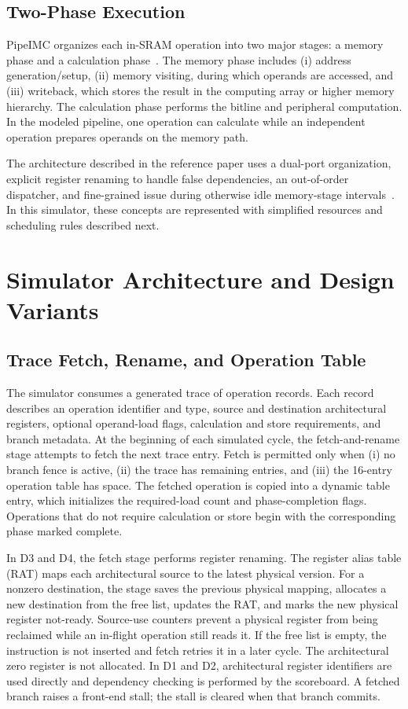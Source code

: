 \documentclass[conference]{IEEEtran}
\begin{document}
\subsection{Two-Phase Execution}
PipeIMC organizes each in-SRAM operation into two major stages: a memory phase and a calculation phase~\cite{pipeimc}. The memory phase includes (i) address generation/setup, (ii) memory visiting, during which operands are accessed, and (iii) writeback, which stores the result in the computing array or higher memory hierarchy. The calculation phase performs the bitline and peripheral computation. In the modeled pipeline, one operation can calculate while an independent operation prepares operands on the memory path.

The architecture described in the reference paper uses a dual-port organization, explicit register renaming to handle false dependencies, an out-of-order dispatcher, and fine-grained issue during otherwise idle memory-stage intervals~\cite{pipeimc}. In this simulator, these concepts are represented with simplified resources and scheduling rules described next.


\section{Simulator Architecture and Design Variants}
\subsection{Trace Fetch, Rename, and Operation Table}
The simulator consumes a generated trace of operation records. Each record describes an operation identifier and type, source and destination architectural registers, optional operand-load flags, calculation and store requirements, and branch metadata. At the beginning of each simulated cycle, the fetch-and-rename stage attempts to fetch the next trace entry. Fetch is permitted only when (i) no branch fence is active, (ii) the trace has remaining entries, and (iii) the 16-entry operation table has space. The fetched operation is copied into a dynamic table entry, which initializes the required-load count and phase-completion flags. Operations that do not require calculation or store begin with the corresponding phase marked complete.

In D3 and D4, the fetch stage performs register renaming. The register alias table (RAT) maps each architectural source to the latest physical version. For a nonzero destination, the stage saves the previous physical mapping, allocates a new destination from the free list, updates the RAT, and marks the new physical register not-ready. Source-use counters prevent a physical register from being reclaimed while an in-flight operation still reads it. If the free list is empty, the instruction is not inserted and fetch retries it in a later cycle. The architectural zero register is not allocated. In D1 and D2, architectural register identifiers are used directly and dependency checking is performed by the scoreboard. A fetched branch raises a front-end stall; the stall is cleared when that branch commits.
\end{document}

